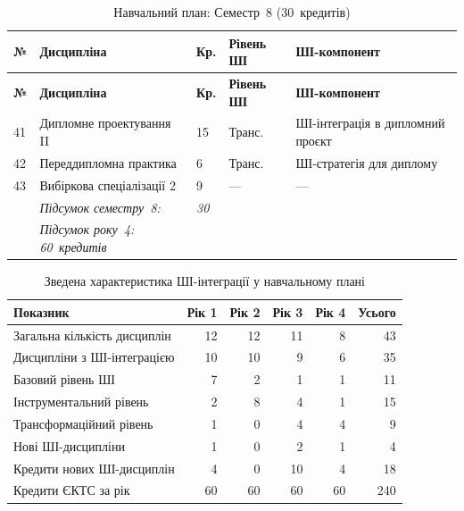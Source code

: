 \begin{longtable}{@{}p{}p{}p{}p{}p{}@{}}
\caption{Навчальний план: Семестр~8 (30~кредитів)}\label{tab:app-sem8} \\
\hline
\textbf{№} & \textbf{Дисципліна} & \textbf{Кр.} & \textbf{Рівень ШІ} & \textbf{ШІ-компонент} \\
\hline
\endfirsthead
\hline
\textbf{№} & \textbf{Дисципліна} & \textbf{Кр.} & \textbf{Рівень ШІ} & \textbf{ШІ-компонент} \\
\hline
\endhead
41 & Дипломне проектування II & 15 & Транс. & ШІ-інтеграція в дипломний проєкт \\
42 & Переддипломна практика & 6 & Транс. & ШІ-стратегія для диплому \\
43 & Вибіркова спеціалізації 2 & 9 & --- & --- \\
\addlinespace
& \textit{Підсумок семестру~8:} & \textit{30} & & \\
& \textit{Підсумок року~4: 60~кредитів} & & & \\
\hline
\end{longtable}

\begin{table}[htbp]
\centering
\caption{Зведена характеристика ШІ-інтеграції у навчальному плані}\label{tab:app-curriculum-summary}
\small
\begin{tabularx}{\textwidth}{@{}Xrrrrr@{}}
\toprule
\textbf{Показник} & \textbf{Рік 1} & \textbf{Рік 2} & \textbf{Рік 3} & \textbf{Рік 4} & \textbf{Усього} \\
\midrule
Загальна кількість дисциплін & 12 & 12 & 11 & 8 & 43 \\
Дисципліни з ШІ-інтеграцією & 10 & 10 & 9 & 6 & 35 \\
\addlinespace
Базовий рівень ШІ & 7 & 2 & 1 & 1 & 11 \\
Інструментальний рівень & 2 & 8 & 4 & 1 & 15 \\
Трансформаційний рівень & 1 & 0 & 4 & 4 & 9 \\
\addlinespace
Нові ШІ-дисципліни & 1 & 0 & 2 & 1 & 4 \\
Кредити нових ШІ-дисциплін & 4 & 0 & 10 & 4 & 18 \\
Кредити ЄКТС за рік & 60 & 60 & 60 & 60 & 240 \\
\bottomrule
\end{tabularx}
\end{table}

\clearpage

